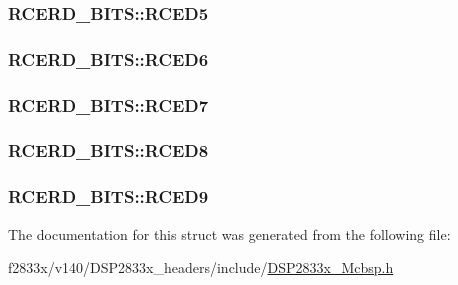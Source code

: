 \subsubsection[{R\+C\+E\+D5}]{ R\+C\+E\+R\+D\+\_\+\+B\+I\+T\+S\+::\+R\+C\+E\+D5}\label{struct_r_c_e_r_d___b_i_t_s_a63e8cadc8dd5c92d80a94c4044162ec7}
\hypertarget{struct_r_c_e_r_d___b_i_t_s_aaed562bef6f2121d1a49182145eac78e}{}
\subsubsection[{R\+C\+E\+D6}]{ R\+C\+E\+R\+D\+\_\+\+B\+I\+T\+S\+::\+R\+C\+E\+D6}\label{struct_r_c_e_r_d___b_i_t_s_aaed562bef6f2121d1a49182145eac78e}
\hypertarget{struct_r_c_e_r_d___b_i_t_s_a14c68ccb4606f307a6eadd3628f104c1}{}
\subsubsection[{R\+C\+E\+D7}]{ R\+C\+E\+R\+D\+\_\+\+B\+I\+T\+S\+::\+R\+C\+E\+D7}\label{struct_r_c_e_r_d___b_i_t_s_a14c68ccb4606f307a6eadd3628f104c1}
\hypertarget{struct_r_c_e_r_d___b_i_t_s_a11c5f9e2f5434adfe34756195759ee19}{}
\subsubsection[{R\+C\+E\+D8}]{ R\+C\+E\+R\+D\+\_\+\+B\+I\+T\+S\+::\+R\+C\+E\+D8}\label{struct_r_c_e_r_d___b_i_t_s_a11c5f9e2f5434adfe34756195759ee19}
\hypertarget{struct_r_c_e_r_d___b_i_t_s_a4a7bc6db9f0e381fb8060cad8517358e}{}
\subsubsection[{R\+C\+E\+D9}]{ R\+C\+E\+R\+D\+\_\+\+B\+I\+T\+S\+::\+R\+C\+E\+D9}\label{struct_r_c_e_r_d___b_i_t_s_a4a7bc6db9f0e381fb8060cad8517358e}


The documentation for this struct was generated from the following file\+:\begin{DoxyCompactItemize}
\item 
f2833x/v140/\+D\+S\+P2833x\+\_\+headers/include/\hyperlink{_d_s_p2833x___mcbsp_8h}{D\+S\+P2833x\+\_\+\+Mcbsp.\+h}\end{DoxyCompactItemize}
